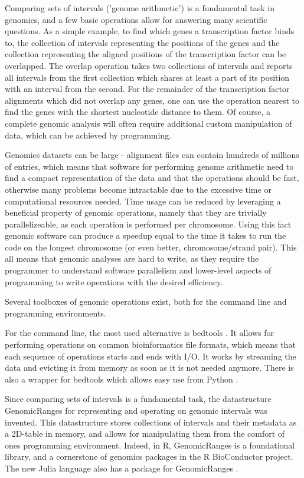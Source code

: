 \documentclass[10pt,letterpaper]{article}
\begin{document}
Comparing sets of intervals ('genome arithmetic') is a fundamental task in
genomics, and a few basic operations allow for answering many scientific
questions. As a simple example, to find which genes a transcription factor binds
to, the collection of intervals representing the positions of the genes and the
collection representing the aligned positions of the transcription factor can be
overlapped. The overlap operation takes two collections of intervals and reports
all intervals from the first collection which shares at least a part of its
position with an interval from the second. For the remainder of the
transcription factor alignments which did not overlap any genes, one can use the
operation nearest to find the genes with the shortest nucleotide
distance to them. Of course, a complete genomic analysis will often require
additional custom manipulation of data, which can be achieved by programming.

Genomics datasets can be large - alignment files can contain hundreds of
millions of entries, which means that software for performing genome arithmetic
need to find a compact representation of the data and that the operations should
be fast, otherwise many problems become intractable due to the excessive time or
computational resources needed. Time usage can be reduced by leveraging a
beneficial property of genomic operations, namely that they are trivially
parallelizeable, as each operation is performed per chromosome. Using this fact
genomic software can produce a speedup equal to the time it takes to run the
code on the longest chromosome (or even better, chromosome/strand pair). This
all means that genomic analyses are hard to write, as they require the
programmer to understand software parallelism and lower-level aspects of
programming to write operations with the desired efficiency.

Several toolboxes of genomic operations exist, both for the command line and
programming environments.

For the command line, the most used alternative is bedtools
\cite{doi:10.1093/bioinformatics/btq033}. It allows for performing operations on
common bioinformatics file formats, which means that each sequence of operations
starts and ends with I/O. It works by streaming the data and evicting it from
memory as soon as it is not needed anymore. There is also a wrapper for bedtools
which allows easy use from Python \cite{doi:10.1093/bioinformatics/btr539}.

Since comparing sets of intervals is a fundamental task, the datastructure
GenomicRanges\cite{10.1371/journal.pcbi.1003118} for representing and operating
on genomic intervals was invented. This datastructure stores collections of
intervals and their metadata as a 2D-table in memory, and allows for
manipulating them from the comfort of ones programming environment. Indeed, in
R, GenomicRanges is a foundational library, and a cornerstone of genomics
packages in the R BioConductor \cite{Gentleman2004} project. The new Julia
language \cite{doi:10.1137/141000671} also has a package for GenomicRanges
\cite{Haverty2017}.
\end{document}
